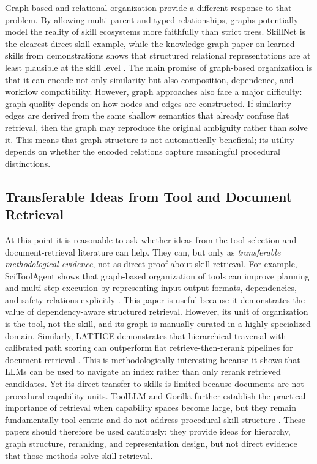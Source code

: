 \documentclass[a4paper]{article}
\begin{document}
Graph-based and relational organization provide a different response to that problem. By allowing multi-parent and typed relationships, graphs potentially model the reality of skill ecosystems more faithfully than strict trees. SkillNet is the clearest direct skill example, while the knowledge-graph paper on learned skills from demonstrations shows that structured relational representations are at least plausible at the skill level \cite{liang2026skillnet, learningkg2026}. The main promise of graph-based organization is that it can encode not only similarity but also composition, dependence, and workflow compatibility. However, graph approaches also face a major difficulty: graph quality depends on how nodes and edges are constructed. If similarity edges are derived from the same shallow semantics that already confuse flat retrieval, then the graph may reproduce the original ambiguity rather than solve it. This means that graph structure is not automatically beneficial; its utility depends on whether the encoded relations capture meaningful procedural distinctions.

\subsection{Transferable Ideas from Tool and Document Retrieval}
At this point it is reasonable to ask whether ideas from the tool-selection and document-retrieval literature can help. They can, but only as \emph{transferable methodological evidence}, not as direct proof about skill retrieval. For example, SciToolAgent shows that graph-based organization of tools can improve planning and multi-step execution by representing input-output formats, dependencies, and safety relations explicitly \cite{ding2025scitoolagent}. This paper is useful because it demonstrates the value of dependency-aware structured retrieval. However, its unit of organization is the tool, not the skill, and its graph is manually curated in a highly specialized domain. Similarly, LATTICE demonstrates that hierarchical traversal with calibrated path scoring can outperform flat retrieve-then-rerank pipelines for document retrieval \cite{gupta2025lattice}. This is methodologically interesting because it shows that LLMs can be used to navigate an index rather than only rerank retrieved candidates. Yet its direct transfer to skills is limited because documents are not procedural capability units. ToolLLM and Gorilla further establish the practical importance of retrieval when capability spaces become large, but they remain fundamentally tool-centric and do not address procedural skill structure \cite{qin2023toolllm, patil2023gorilla}. These papers should therefore be used cautiously: they provide ideas for hierarchy, graph structure, reranking, and representation design, but not direct evidence that those methods solve skill retrieval.
\end{document}
